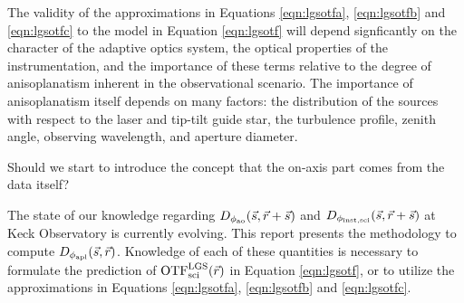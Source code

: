 
The validity of the approximations in Equations \ref{eqn:lgsotfa},
\ref{eqn:lgsotfb} and \ref{eqn:lgsotfc} to the model in Equation \ref{eqn:lgsotf}
will depend signficantly on the character of the adaptive optics
system, the optical properties of the instrumentation, and the
importance of these terms relative to the degree of anisoplanatism
inherent in the observational scenario.  The importance of
anisoplanatism itself depends on many factors: the distribution of the
sources with respect to the laser and tip-tilt guide star, the
turbulence profile, zenith angle, observing wavelength, and aperture
diameter.  
\begin{notes}
Should we start to introduce the concept that the on-axis part
comes from the data itself? 
\end{notes}

The state of our knowledge regarding $D_{\rm
  \phi_{ao}}(\vec{s},\vec{r} + \vec{s})$ and
$D_{\rm \phi_{inst,sci}}(\vec{s},\vec{r} +
\vec{s})$ at Keck Observatory is currently evolving.  This
report presents the methodology to compute $D_{\rm
  \phi_{apl}}(\vec{s},\vec{r})$.  Knowledge of each of
these quantities is necessary to formulate the prediction of
${\rm OTF}^{\rm LGS}_{\rm sci}(\vec{r})$ in Equation \ref{eqn:lgsotf}, or to
utilize the approximations in Equations \ref{eqn:lgsotfa}, \ref{eqn:lgsotfb}
and \ref{eqn:lgsotfc}.

